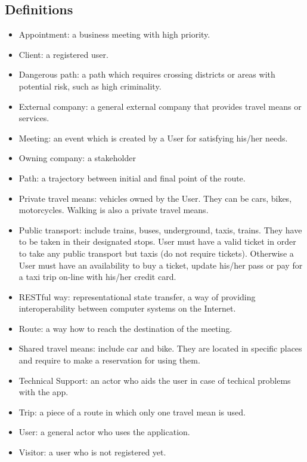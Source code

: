 \documentclass[a4paper,leqno]{book}
\begin{document}
\subsection{Definitions}
\begin{itemize}
	\item Appointment: a business meeting with high priority.
	\item Client: a registered user.
	\item Dangerous path: a path which requires crossing districts or areas with potential risk, such as high criminality.
	\item External company: a general external company that provides travel means or services.
	\item Meeting: an event which is created by a User for satisfying his/her needs.
	\item Owning company: a stakeholder
	\item Path: a trajectory between initial and final point of the route.
	\item Private travel means: vehicles owned by the User. They can be cars, bikes, motorcycles. Walking is also a private travel means.
	\item Public transport: include trains, buses, underground, taxis, trains. They have to be taken in their designated stops. User must have a valid ticket in order to take any public transport but taxis (do not require tickets). Otherwise a User must have an availability to buy a ticket, update his/her pass or pay for a taxi trip on-line with his/her credit card.
	\item RESTful way:  representational state transfer, a way of providing interoperability between computer systems on the Internet.
	\item Route: a way how to reach the destination of the meeting.
	\item Shared travel means: include car and bike. They are located in specific places and require to make a reservation for using them.
	\item Technical Support: an actor who aids the user in case of techical problems with the app.
	\item Trip: a piece of a route in which only one travel mean is used.
	\item User: a general actor who uses the application.
	\item Visitor: a user who is not registered yet.
\end{itemize}
\end{document}
